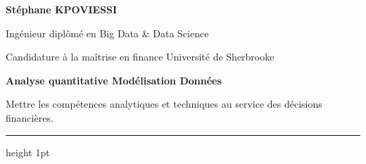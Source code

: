 \documentclass[10pt,a4paper]{article}
\begin{document}
\fontsize{10pt}{12.3pt}\selectfont
\sloppy

\begin{minipage}[t]{0.52\textwidth}
{\LARGE\bfseries\color{accentdark} Stéphane KPOVIESSI}\par
\vspace{1pt}
{\large\color{accent}Ingénieur diplômé en Big Data \& Data Science}\par
\vspace{1pt}
{\color{muted}Candidature à la maîtrise en finance \textbullet{} Université de Sherbrooke}
\end{minipage}
\hfill
\begin{minipage}[t]{0.42\textwidth}
\raggedleft
\vspace{2pt}
{\normalsize\bfseries\color{accent}Analyse quantitative \textbullet{} Modélisation \textbullet{} Données}\par
\vspace{3pt}
{\small\color{muted}
Mettre les compétences analytiques et techniques au service des décisions financières.
}
\end{minipage}

\vspace{6pt}
{\color{rule}\hrule height 1pt}
\vspace{7pt}
\end{document}
